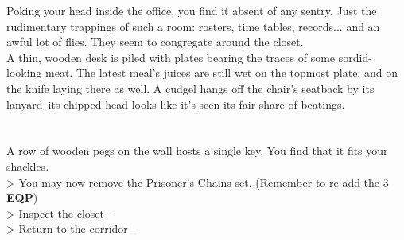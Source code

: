 Poking your head inside the office, you find it absent of any sentry. Just the rudimentary trappings of such a room: rosters, time tables, records... and an awful lot of flies. They seem to congregate around the closet.\\

A thin, wooden desk is piled with plates bearing the traces of some sordid-looking meat. The latest meal’s juices are still wet on the topmost plate, and on the knife laying there as well. A cudgel hangs off the chair’s seatback by its lanyard--its chipped head looks like it’s seen its fair share of beatings.\\
\\
\\

A row of wooden pegs on the wall hosts a single key. You find that it fits your shackles.\\
> You may now remove the Prisoner’s Chains set. (Remember to re-add the 3 \textbf{EQP})\\

> Inspect the closet --  \\
> Return to the corridor -- 
